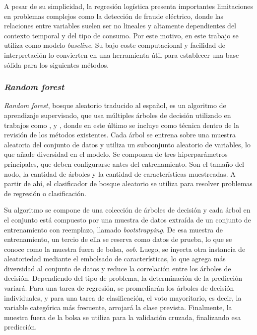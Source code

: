 \documentclass[12pt,a4paper]{report}
\begin{document}
A pesar de su simplicidad, la regresión logística presenta importantes limitaciones en problemas complejos como la detección de fraude eléctrico, donde las relaciones entre variables suelen ser no lineales y altamente dependientes del contexto temporal y del tipo de consumo. Por este motivo, en este trabajo se utiliza como modelo \emph{baseline}. Su bajo coste computacional y facilidad de interpretación lo convierten en una herramienta útil para establecer una base sólida para los siguientes métodos.


\subsubsection{\emph{Random forest}}

\emph{Random forest}, bosque aleatorio traducido al español, es un algoritmo de aprendizaje supervisado, que usa múltiples árboles de decisión utilizado en trabajos como \cite{articuloBase}, \cite{articulo2} y \cite{articulo3}, donde en este último se incluye como técnica dentro de la revisión de los métodos existentes. Cada árbol se entrena sobre una muestra aleatoria del conjunto de datos y utiliza un subconjunto aleatorio de variables, lo que añade diversidad en el modelo. Se componen de tres hiperparámetros principales, que deben configurarse antes del entrenamiento. Son el tamaño del nodo, la cantidad de árboles y la cantidad de características muestreadas. A partir de ahí, el clasificador de bosque aleatorio se utiliza para resolver problemas de regresión o clasificación.

Su algoritmo se compone de una colección de árboles de decisión y cada árbol en el conjunto está compuesto por una muestra de datos extraída de un conjunto de entrenamiento con reemplazo, llamado \emph{bootstrapping}. De esa muestra de entrenamiento, un tercio de ella se reserva como datos de prueba, lo que se conoce como la muestra fuera de bolsa, \emph{oob}. Luego, se inyecta otra instancia de aleatoriedad mediante el embolsado de características, lo que agrega más diversidad al conjunto de datos y reduce la correlación entre los árboles de decisión. Dependiendo del tipo de problema, la determinación de la predicción variará. Para una tarea de regresión, se promediarán los árboles de decisión individuales, y para una tarea de clasificación, el voto mayoritario, es decir, la variable categórica más frecuente, arrojará la clase prevista. Finalmente, la muestra fuera de la bolsa se utiliza para la validación cruzada, finalizando esa predicción.
\end{document}

